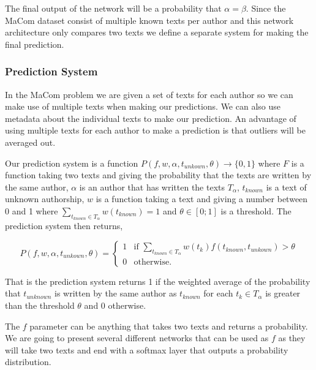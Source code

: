 The final output of the network will be a probability that $\alpha = \beta$.
Since the MaCom dataset consist of multiple known texts per author and this
network architecture only compares two texts we define a separate system for
making the final prediction.

\subsubsection{Prediction System}

In the MaCom problem we are given a set of texts for each author so we can make
use of multiple texts when making our predictions. We can also use metadata
about the individual texts to make our prediction. An advantage of using
multiple texts for each author to make a prediction is that outliers will be
averaged out.

\begin{definition}

    \label{def:prediction_system}

    Our prediction system is a function $P(f, w, \alpha, t_{unkown}, \theta)
    \rightarrow \{0, 1\}$ where $F$ is a function taking two texts and giving
    the probability that the texts are written by the same author, $\alpha$ is
    an author that has written the texts $T_{\alpha}$, $t_{known}$ is a text
    of unknown authorship, $w$ is a function taking a text and giving a number
    between 0 and 1 where $\sum_{t_{known} \in T_\alpha} w(t_{known}) = 1$ and
    $\theta \in [0;1]$ is a threshold. The prediction system then returns,

    \begin{equation}
        P(f, w, \alpha, t_{unkown}, \theta) = \begin{cases}
            1 & \text{if } \sum_{t_{known} \in T_\alpha} w(t_k) f(t_{known}, t_{unkown}) > \theta \\
            0 & \text{otherwise}.
        \end{cases}
    \end{equation}

\end{definition}

That is the prediction system returns 1 if the weighted average of the
probability that $t_{unknown}$ is written by the same author as $t_{known}$ for
each $t_k \in T_\alpha$ is greater than the threshold $\theta$ and 0 otherwise.

The $f$ parameter can be anything that takes two texts and returns a
probability. We are going to present several different networks that can be used
as $f$ as they will take two texts and end with a softmax layer that outputs a
probability distribution.

